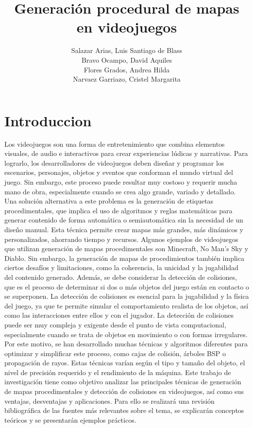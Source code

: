 \documentclass[stu, 12pt, letterpaper, donotrepeattitle, floatsintext, natbib]{apa7}
\title{\Large Generación procedural de mapas en videojuegos}
\author{Salazar Arias, Luis Santiago de Blass \\Bravo Ocampo, David Aquiles \\ Flores Grados, Andrea Hilda\\ Narvaez Garriazo, Cristel Margarita} %
\affiliation{\Huge\textbf{Universidad San Ignacio de Loyola}}
\begin{document}
\maketitle


\renewcommand\contentsname{\largeÍndice}
\tableofcontents
\setcounter{tocdepth}{2}
\newpage
\renewcommand{\listfigurename}{\largeÍndice de fíguras}
\listoffigures
\newpage
\renewcommand{\listtablename}{\largeÍndice de tablas}
\listoftables
\newpage


\section{\large Introduccion}
Los videojuegos son una forma de entretenimiento que combina elementos visuales, de audio e 
interactivos para crear experiencias lúdicas y narrativas. Para lograrlo, los desarrolladores de 
videojuegos deben diseñar y programar los escenarios, personajes, objetos y eventos que 
conforman el mundo virtual del juego. Sin embargo, este proceso puede resultar muy costoso y 
requerir mucha mano de obra, especialmente cuando se crea algo grande, variado y detallado. 
Una solución alternativa a este problema es la generación de etiquetas procedimentales, que 
implica el uso de algoritmos y reglas matemáticas para generar contenido de forma automática 
o semiautomática sin la necesidad de un diseño manual. Esta técnica permite crear mapas más 
grandes, más dinámicos y personalizados, ahorrando tiempo y recursos. Algunos ejemplos de 
videojuegos que utilizan generación de mapas procedimentales son Minecraft, No Man's Sky y 
Diablo. Sin embargo, la generación de mapas de procedimientos también implica ciertos desafíos 
y limitaciones, como la coherencia, la unicidad y la jugabilidad del contenido generado. Además, 
se debe considerar la detección de colisiones, que es el proceso de determinar si dos o más 
objetos del juego están en contacto o se superponen. La detección de colisiones es esencial para 
la jugabilidad y la física del juego, ya que te permite simular el comportamiento realista de los 
objetos, así como las interacciones entre ellos y con el jugador. La detección de colisiones puede 
ser muy compleja y exigente desde el punto de vista computacional, especialmente cuando se 
trata de objetos en movimiento o con formas irregulares. Por este motivo, se han desarrollado 
muchas técnicas y algoritmos diferentes para optimizar y simplificar este proceso, como cajas de 
colisión, árboles BSP o propagación de rayos. Estas técnicas varían según el tipo y tamaño del 
objeto, el nivel de precisión requerido y el rendimiento de la máquina. Este trabajo de investigación 
tiene como objetivo analizar las principales técnicas de generación de mapas procedimentales y detección 
de colisiones en videojuegos, así como sus ventajas, desventajas y aplicaciones. Para ello se realizará 
una revisión bibliográfica de las fuentes más relevantes sobre el tema, se explicarán conceptos teóricos 
y se presentarán ejemplos prácticos.\\
\end{document}
